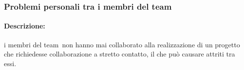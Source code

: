 \documentclass[../PianoProgetto.tex]{subfiles}
\begin{document}
\newpage
\subsubsection{Problemi personali tra i membri del team}
\label{sec:Problemi personali tra i membri del team}

	\paragraph*{Descrizione:} i membri del team\g\ non hanno mai collaborato alla realizzazione di un progetto che richiedesse collaborazione a stretto contatto, il che può causare attriti tra essi.
	
	
\end{document}
